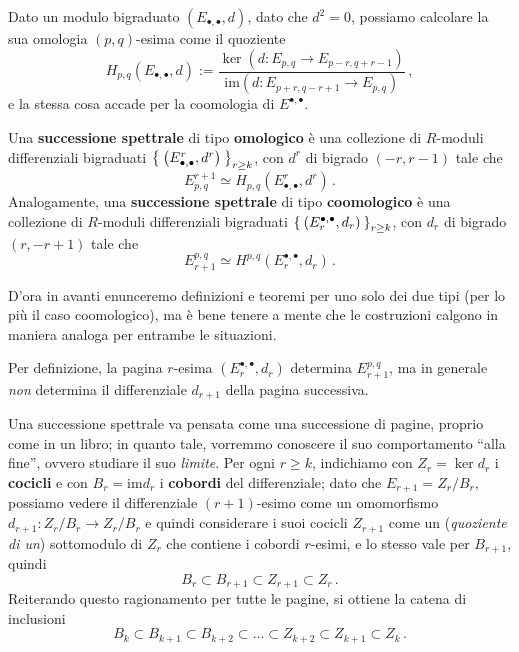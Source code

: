Dato un modulo bigraduato $(E_{\bullet,\bullet},d)$, 
dato che $d^{2}=0$, possiamo calcolare la sua omologia $(p,q)$-esima 
come il quoziente
\begin{equation*}
	H_{p,q}(E_{\bullet,\bullet},d) := \dfrac{\ker\left( d : E_{p,q} \to E_{p-r,q+r-1} \right)}{\mathrm{im}\left( d: E_{p+r,q-r+1} \to E_{p,q} \right)}\,,
\end{equation*}
e la stessa cosa accade per la coomologia di $E^{\bullet,\bullet}$. 

\begin{df}
	Una \textbf{successione spettrale} di tipo \textbf{omologico}
	è una collezione di $R$-moduli differenziali bigraduati 
	$\Set{ \left(E^{r}_{\bullet,\bullet},d^{r}\right)}_{r \ge k}$,
	con $d^{r}$ di bigrado $(-r,r-1)$ tale che 
	\begin{equation*}
		E^{r+1}_{p,q} \simeq H_{p,q} \left( E_{\bullet,\bullet}^{r}, d^{r} \right)\,.
	\end{equation*}
	Analogamente, una \textbf{successione spettrale} di tipo \textbf{coomologico}
	è una collezione di $R$-moduli differenziali bigraduati 
	$\Set{ \left(E_{r}^{\bullet,\bullet},d_{r}\right)}_{r \ge k}$,
	con $d_{r}$ di bigrado $(r,-r+1)$ tale che 
	\begin{equation*}
		E_{r+1}^{p,q} \simeq H^{p,q} \left( E^{\bullet,\bullet}_{r}, d_{r} \right)\,.
	\end{equation*}
\end{df}

D'ora in avanti enunceremo definizioni e teoremi per uno solo dei due tipi
(per lo più il caso coomologico), ma è bene tenere a mente che
le costruzioni calgono in maniera analoga per entrambe le situazioni.

\begin{oss}
	Per definizione, la pagina $r$-esima $(E_{r}^{\bullet,\bullet},d_{r})$
	determina $E_{r+1}^{p,q}$, ma in generale
	\emph{non} determina il differenziale $d_{r+1}$ della pagina successiva.
\end{oss}

Una successione spettrale va pensata come una successione di pagine,
proprio come in un libro; in quanto tale, vorremmo conoscere
il suo comportamento ``alla fine'', ovvero studiare il suo \emph{limite}.
Per ogni $r \ge k$, indichiamo con $Z_{r}=\ker d_{r}$ i \textbf{cocicli} 
e con $B_{r}=\mathrm{im}d_{r}$ i \textbf{cobordi} del differenziale;
dato che $E_{r+1}=Z_{r}/B_{r}$, possiamo vedere il differenziale $(r+1)$-esimo
come un omomorfismo $d_{r+1} : Z_{r}/B_{r} \to Z_{r}/B_{r}$ e quindi 
considerare i suoi cocicli $Z_{r+1}$ come un (\emph{quoziente di un})
sottomodulo di $Z_{r}$ che contiene i cobordi $r$-esimi,
e lo stesso vale per $B_{r+1}$, quindi
\begin{equation*}
	B_{r} \subset B_{r+1} \subset Z_{r+1} \subset Z_{r}\,. 
\end{equation*}
Reiterando questo ragionamento per tutte le pagine, si ottiene la catena di inclusioni
\begin{equation*}
	B_{k} \subset B_{k+1} \subset B_{k+2} \subset \dots \subset Z_{k+2} \subset Z_{k+1} \subset Z_{k}\,.
\end{equation*}


